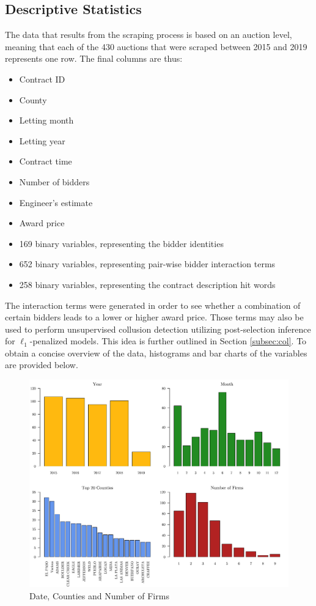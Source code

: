 \documentclass[a4paper,12pt, headsepline]{scrartcl}
\numberwithin{equation}{section}
\begin{document}
\subsection{Descriptive Statistics}\label{subsec:desc}
The data that results from the scraping process is based on an auction level, meaning that each of the 430 auctions that were scraped between 2015 and 2019 represents one row. The final columns are thus:

\begin{itemize}
	\item Contract ID
	\item County
	\item Letting month
	\item Letting year
	\item Contract time
	\item Number of bidders
	\item Engineer's estimate
	\item Award price
	\item 169 binary variables, representing the bidder identities
	\item 652 binary variables, representing pair-wise bidder interaction terms 
	\item 258 binary variables, representing the contract description hit words
\end{itemize}

The interaction terms were generated in order to see whether a combination of certain bidders leads to a lower or higher award price. Those terms may also be used to perform unsupervised collusion detection utilizing post-selection inference for $\ell_1$-penalized models. This idea is further outlined in Section \ref{subsec:col}. To obtain a concise overview of the data,  histograms and bar charts of the variables are provided below.

\begin{figure}[H]
	\includegraphics[width = 14	cm]{figures/barplots_n.pdf}
	\caption{Date, Counties and Number of Firms}\label{fig:barplots}
\end{figure}
\end{document}
